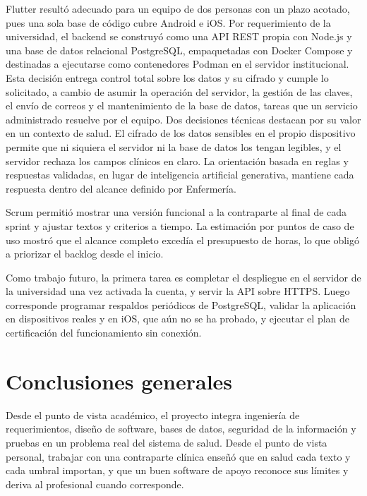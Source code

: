 Flutter resultó adecuado para un equipo de dos personas con un plazo acotado,
pues una sola base de código cubre Android e iOS. Por requerimiento de la
universidad, el backend se construyó como una API REST propia con Node.js y una
base de datos relacional PostgreSQL, empaquetadas con Docker Compose y destinadas
a ejecutarse como contenedores Podman en el servidor institucional. Esta decisión
entrega control total sobre los datos y su cifrado y cumple lo solicitado, a
cambio de asumir la operación del servidor, la gestión de las claves, el envío
de correos y el mantenimiento de la base de datos, tareas que un servicio
administrado resuelve por el equipo. Dos decisiones técnicas destacan por su
valor en un contexto de salud. El cifrado de los datos sensibles en el propio
dispositivo permite que ni siquiera el servidor ni la base de datos los tengan
legibles, y el servidor rechaza los campos clínicos en claro. La orientación
basada en reglas y respuestas validadas, en lugar de inteligencia artificial
generativa, mantiene cada respuesta dentro del alcance definido por Enfermería.

Scrum permitió mostrar una versión funcional a la contraparte al final de cada
sprint y ajustar textos y criterios a tiempo. La estimación por puntos de caso
de uso mostró que el alcance completo excedía el presupuesto de horas, lo que
obligó a priorizar el backlog desde el inicio.

Como trabajo futuro, la primera tarea es completar el despliegue en el servidor
de la universidad una vez activada la cuenta, y servir la API sobre HTTPS. Luego
corresponde programar respaldos periódicos de PostgreSQL, validar la aplicación
en dispositivos reales y en iOS, que aún no se ha probado, y ejecutar el plan de
certificación del funcionamiento sin conexión.

\section{Conclusiones generales}

Desde el punto de vista académico, el proyecto integra ingeniería de
requerimientos, diseño de software, bases de datos, seguridad de la información
y pruebas en un problema real del sistema de salud. Desde el punto de vista
personal, trabajar con una contraparte clínica enseñó que en salud cada texto y
cada umbral importan, y que un buen software de apoyo reconoce sus límites y
deriva al profesional cuando corresponde.

